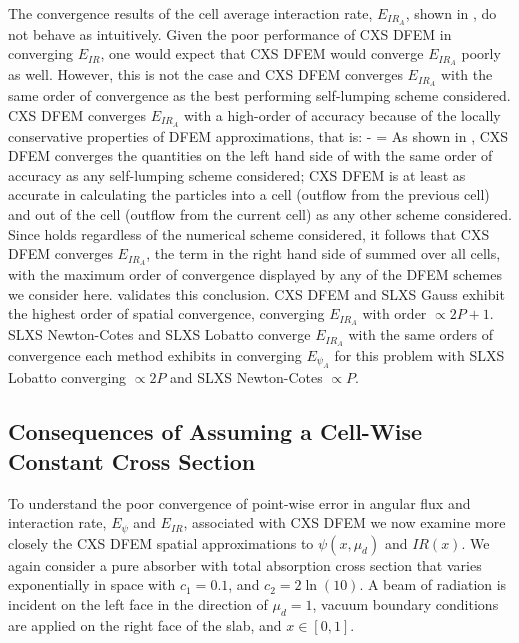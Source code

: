 The convergence results of the cell average interaction rate, $E_{IR_A}$, shown in , do not behave as intuitively.  Given the poor performance of CXS DFEM in converging $E_{IR}$, one would expect that CXS DFEM would converge $E_{IR_A}$ poorly as well.  
However, this is not the case and CXS DFEM converges $E_{IR_A}$ with the same order of convergence as the best performing self-lumping scheme considered.
CXS DFEM converges $E_{IR_A}$ with a high-order of accuracy because of the locally conservative properties of DFEM approximations, that is:
\benum
{} -  =   \pep
\label{eq:chap3_balance}
\eenum
As shown in , CXS DFEM converges the quantities on the left hand side of  with the same order of accuracy as any self-lumping scheme considered; CXS DFEM is at least as accurate in calculating the particles into a cell (outflow from the previous cell) and out of the cell (outflow from the current cell) as any other scheme considered.
Since  holds regardless of the numerical scheme considered, it follows that CXS DFEM converges $E_{IR_A}$, the term in the right hand side of  summed over all cells, with the maximum order of convergence displayed by any of the DFEM schemes we consider here.
 validates this conclusion.
CXS DFEM and SLXS Gauss exhibit the highest order of spatial convergence, converging $E_{IR_A}$ with order $\propto 2P + 1$.  
SLXS Newton-Cotes and SLXS Lobatto converge $E_{IR_A}$ with the same orders of convergence each method exhibits in converging $E_{\psi_A}$ for this problem with SLXS Lobatto converging $\propto 2P$ and SLXS Newton-Cotes $\propto P$.

\subsection{Consequences of Assuming a Cell-Wise Constant Cross Section}

To understand the poor convergence of point-wise error in angular flux and interaction rate, $E_{\psi}$ and $E_{IR}$, associated with CXS DFEM  we now examine more closely the CXS DFEM spatial approximations to $\psi(x,\mu_d)$ and $IR(x)$. 
We again consider a pure absorber with total absorption cross section that varies exponentially in space with $c_1 = 0.1$, and $c_2 = 2\ln(10)$.  
A beam of radiation is incident on the left face in the direction of $\mu_d=1$, vacuum boundary conditions are applied on the right face of the slab, and $x\in[0, 1]$.    

